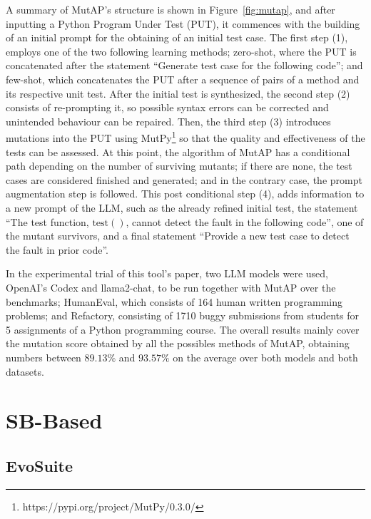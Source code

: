 \documentclass[%
  chapterprefix=false,%
  open=right,%
  twoside=true,%
  paper=a4,%
  logofile={Figures/logo.png},%
  thesistype=master,%
  UKenglish,%
]{se2thesis}
\begin{document}
A summary of MutAP's structure is shown in Figure~\ref{fig:mutap}, and after inputting a Python Program Under Test (PUT), it commences with the building of an initial prompt for the obtaining of an initial test case.
The first step (1), employs one of the two following learning methods; zero-shot, where the PUT is concatenated after the statement  ``Generate test case for the following code''; and few-shot, which concatenates the PUT after a sequence of pairs of a method and its respective unit test.
After the initial test is synthesized, the second step (2) consists of re-prompting it, so possible syntax errors can be corrected and unintended behaviour can be repaired.
Then, the third step (3) introduces mutations into the PUT using MutPy\footnote{https://pypi.org/project/MutPy/0.3.0/} so that the quality and effectiveness of the tests can be assessed.
At this point, the algorithm of MutAP has a conditional path depending on the number of surviving mutants; if there are none, the test cases are considered finished and generated; and in the contrary case, the prompt augmentation step is followed.
This post conditional step (4), adds information to a new prompt of the LLM, such as the already refined initial test, the statement ``The test function, \(\text{test}()\), cannot detect the fault in the
following code'', one of the mutant survivors, and a final statement ``Provide a new test case to detect the fault in prior code''.

In the experimental trial of this tool's paper, two LLM models were used, OpenAI's Codex and llama2-chat, to be run together with MutAP over the benchmarks; HumanEval, which consists of 164 human written programming problems; and Refactory, consisting of 1710 buggy submissions from students for 5 assignments of a Python programming course.
The overall results mainly cover the mutation score obtained by all the possibles methods of MutAP, obtaining numbers between \(89.13\%\) and \(93.57\%\) on the average over both models and both datasets.


\section{SB-Based}

\subsection*{EvoSuite}
\end{document}
